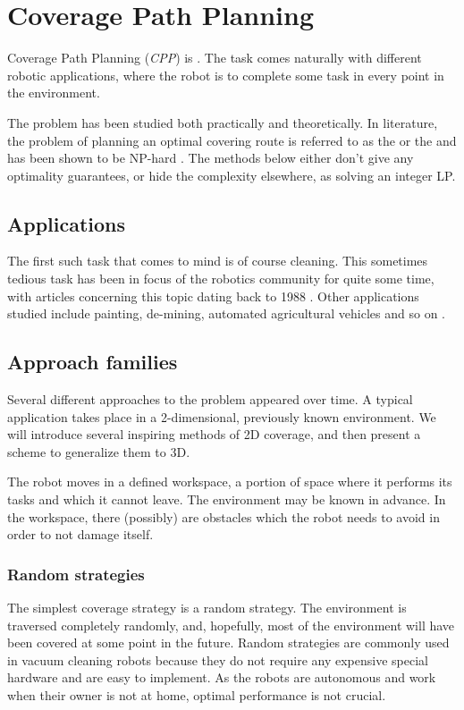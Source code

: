 \documentclass[buriama8_dp.tex]{subfiles}
\begin{document}
\chapter{Coverage Path Planning}
\label{chap:cpp}

Coverage Path Planning (\textit{CPP}) is . The task comes naturally with different robotic applications, where the robot is to complete some task in every point in the environment.

The problem has been studied both practically and theoretically. In literature, the problem of planning an optimal covering route is referred to as the  or the  and has been shown to be NP-hard \cite{lawnmowing}. The methods below either don't give any optimality guarantees, or hide the complexity elsewhere, as solving an integer LP.

\section{Applications}
The first such task that comes to mind is of course cleaning. This sometimes tedious task has been in focus of the robotics community for quite some time, with articles concerning this topic dating back to 1988 \cite{cleaning88}. Other applications studied include painting, de-mining, automated agricultural vehicles and so on \cite[sec.~1]{survey13}.


\section{Approach families}

Several different approaches to the problem appeared over time. A typical application takes place in a 2-dimensional, previously known environment. We will introduce several inspiring methods of 2D coverage, and then present a scheme to generalize them to 3D.

The robot moves in a defined workspace, a portion of space where it performs its tasks and which it cannot leave. The environment may be known in advance. In the workspace, there (possibly) are obstacles which the robot needs to avoid in order to not damage itself.

\subsection{Random strategies}
\label{subsec:random_cpp}
The simplest coverage strategy is a random strategy. The environment is traversed completely randomly, and, hopefully, most of the environment will have been covered at some point in the future. Random strategies are commonly used in vacuum cleaning robots because they do not require any expensive special hardware and are easy to implement. As the robots are autonomous and work when their owner is not at home, optimal performance is not crucial.
\end{document}
